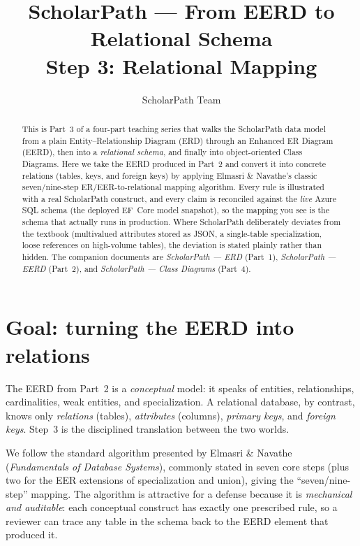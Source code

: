 \documentclass[11pt,a4paper]{article}
\title{ScholarPath --- From EERD to Relational Schema\\[0.3em]\large Step 3: Relational Mapping}
\author{ScholarPath Team}
\date{}
\begin{document}
\maketitle

\begin{abstract}
\noindent This is Part~3 of a four-part teaching series that walks the ScholarPath
data model from a plain Entity--Relationship Diagram (ERD) through an Enhanced
ER Diagram (EERD), then into a \emph{relational schema}, and finally into
object-oriented Class Diagrams. Here we take the EERD produced in Part~2 and
convert it into concrete relations (tables, keys, and foreign keys) by applying
Elmasri \& Navathe's classic seven/nine-step ER/EER-to-relational mapping
algorithm. Every rule is illustrated with a real ScholarPath construct, and
every claim is reconciled against the \emph{live} Azure SQL schema (the deployed
EF~Core model snapshot), so the mapping you see is the schema that actually
runs in production. Where ScholarPath deliberately
deviates from the textbook (multivalued attributes stored as JSON, a
single-table specialization, loose references on high-volume tables), the
deviation is stated plainly rather than hidden. The companion documents are
\emph{ScholarPath --- ERD} (Part~1), \emph{ScholarPath --- EERD} (Part~2), and
\emph{ScholarPath --- Class Diagrams} (Part~4).
\end{abstract}

\tableofcontents

\section{Goal: turning the EERD into relations}

The EERD from Part~2 is a \emph{conceptual} model: it speaks of entities,
relationships, cardinalities, weak entities, and specialization. A relational
database, by contrast, knows only \emph{relations} (tables), \emph{attributes}
(columns), \emph{primary keys}, and \emph{foreign keys}. Step~3 is the
disciplined translation between the two worlds.

We follow the standard algorithm presented by Elmasri \& Navathe
(\emph{Fundamentals of Database Systems}), commonly stated in seven core steps
(plus two for the EER extensions of specialization and union), giving the
``seven/nine-step'' mapping. The algorithm is attractive for a defense because
it is \emph{mechanical and auditable}: each conceptual construct has exactly one
prescribed rule, so a reviewer can trace any table in the schema back to the
EERD element that produced it.
\end{document}
